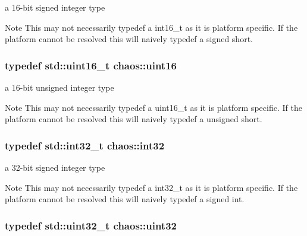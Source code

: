 a 16-\/bit signed integer type 

\begin{DoxyNote}{Note}
This may not necessarily {\ttfamily typedef} a {\ttfamily int16\-\_\-t} as it is platform specific. If the platform cannot be resolved this will naively {\ttfamily typedef} a {\ttfamily signed short}. 
\end{DoxyNote}
\hypertarget{namespacechaos_a7957eb5f7af90c890c4b14dfd3c95c5f}{
\subsubsection[{uint16}]{\setlength{\rightskip}{0pt plus 5cm}typedef std\-::uint16\-\_\-t {\bf chaos\-::uint16}}}\label{namespacechaos_a7957eb5f7af90c890c4b14dfd3c95c5f}


a 16-\/bit unsigned integer type 

\begin{DoxyNote}{Note}
This may not necessarily {\ttfamily typedef} a {\ttfamily uint16\-\_\-t} as it is platform specific. If the platform cannot be resolved this will naively {\ttfamily typedef} a {\ttfamily unsigned short}. 
\end{DoxyNote}
\hypertarget{namespacechaos_aba819cd899114dc5873e32e7b26411c4}{
\subsubsection[{int32}]{\setlength{\rightskip}{0pt plus 5cm}typedef std\-::int32\-\_\-t {\bf chaos\-::int32}}}\label{namespacechaos_aba819cd899114dc5873e32e7b26411c4}


a 32-\/bit signed integer type 

\begin{DoxyNote}{Note}
This may not necessarily {\ttfamily typedef} a {\ttfamily int32\-\_\-t} as it is platform specific. If the platform cannot be resolved this will naively {\ttfamily typedef} a {\ttfamily signed int}. 
\end{DoxyNote}
\hypertarget{namespacechaos_a8641b3ae4551f0b35570d4f9f4ec22d9}{
\subsubsection[{uint32}]{\setlength{\rightskip}{0pt plus 5cm}typedef std\-::uint32\-\_\-t {\bf chaos\-::uint32}}}\label{namespacechaos_a8641b3ae4551f0b35570d4f9f4ec22d9}


